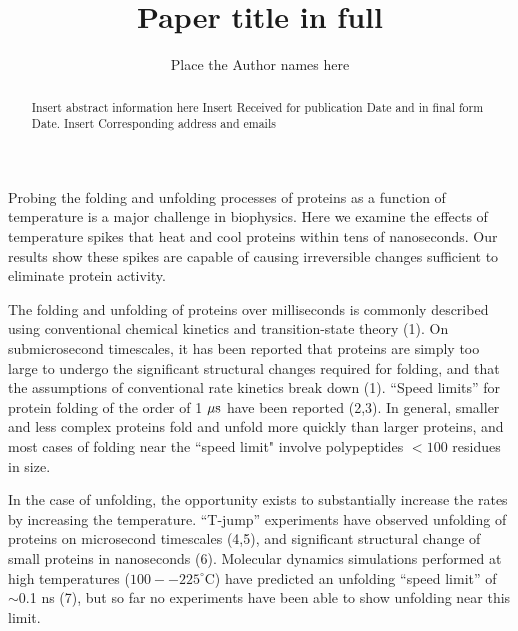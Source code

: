 \documentclass{biophys}
\begin{document}
\setcounter{page}{1} %

\title{Paper title in full}


\author{Place the Author names here}

\address{Place the Author addresses here}





\begin{abstract}%
{Insert abstract information here}%
{Insert Received for publication Date and in final form Date.}%
{Insert Corresponding address and emails}%
\end{abstract}

\maketitle %


Probing the folding and unfolding processes of proteins as a function of temperature is a major challenge in biophysics. Here we examine the effects of temperature spikes that heat and  cool proteins within tens of nanoseconds. Our results show these spikes are capable of causing irreversible changes sufficient to eliminate protein activity.

The folding and unfolding of proteins over milliseconds is commonly described using conventional chemical kinetics and transition-state theory (1). On submicrosecond timescales, it has been reported that proteins are simply too large to undergo the significant structural changes required for folding, and that the assumptions of conventional rate kinetics break down (1). ``Speed limits'' for protein folding of the order of 1 $\mu{\rm s}$ have been reported (2,3). In general, smaller and less complex proteins fold and unfold more quickly than larger proteins, and most cases of folding near the ``speed limit" involve polypeptides ${<}100$ residues in size.

In the case of unfolding, the opportunity exists to substantially increase the rates by increasing the temperature. ``T-jump'' experiments have observed unfolding of proteins on microsecond timescales (4,5), and significant structural change of small proteins in nanoseconds (6). Molecular dynamics simulations performed at high temperatures ($100--225^\circ$C) have predicted an unfolding ``speed limit'' of $\sim$0.1 ns (7), but so far no experiments have been able to show unfolding near this limit.
\end{document}
